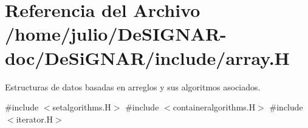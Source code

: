 \hypertarget{array_8_h}{}\section{Referencia del Archivo /home/julio/\+De\+S\+I\+G\+N\+A\+R-\/doc/\+De\+Si\+G\+N\+A\+R/include/array.H}
\label{array_8_h}


Estructuras de datos basadas en arreglos y sus algoritmos asociados.  


{\ttfamily \#include $<$setalgorithms.\+H$>$}\newline
{\ttfamily \#include $<$containeralgorithms.\+H$>$}\newline
{\ttfamily \#include $<$iterator.\+H$>$}\newline
